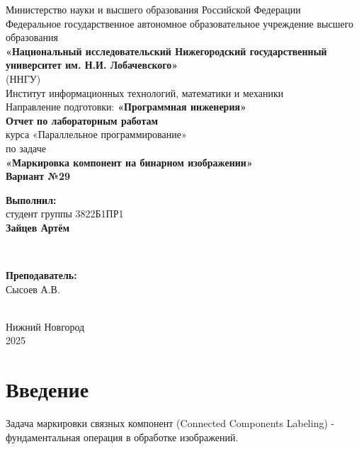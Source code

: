 \documentclass[a4paper,14pt]{article}
\begin{document}
\begin{titlepage}
    \centering
    \large
    Министерство науки и высшего образования Российской Федерации\\[0.5cm]
    Федеральное государственное автономное образовательное учреждение высшего образования\\[0.5cm]
    \textbf{«Национальный исследовательский Нижегородский государственный университет им. Н.И. Лобачевского»}\\
    (ННГУ)\\[1cm]
    Институт информационных технологий, математики и механики\\[0.5cm]
    Направление подготовки: \textbf{«Программная инженерия»}\\[1ю5cm]

    \vfill
    {\LARGE \textbf{Отчет по лабораторным работам }}\\[0.5cm]
    {\Large курса «Параллельное программирование» }\\[0.5cm]
    {\Large по задаче}\\[0.5cm]
    {\LARGE \textbf{«Маркировка компонент на бинарном изображении»}}\\[0.5cm]
    {\Large \textbf{Вариант №29}}\\[2.5cm]

    \hfill\parbox{0.5\textwidth}{
        \textbf{Выполнил:} \\
        студент группы 3822Б1ПР1 \\
        \textbf{Зайцев Артём}
    }\\[0.5cm]

    \hfill\parbox{0.5\textwidth}{
        \textbf{Преподаватель:} \\
        Сысоев А.В.

    }\\[2cm]
    
    \vfill
    { Нижний Новгород } \\
    { 2025 }
\end{titlepage}

\section{Введение}

Задача маркировки связных компонент (Connected Components Labeling) - фундаментальная операция в обработке изображений.
\end{document}
